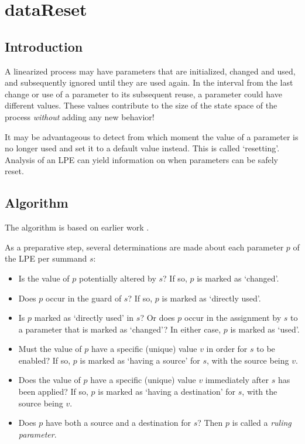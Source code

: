 \chapter{dataReset}

\section{Introduction}

A linearized process may have parameters that are initialized, changed and used, and subsequently ignored until they are used again.
In the interval from the last change or use of a parameter to its subsequent reuse, a parameter could have different values.
These values contribute to the size of the state space of the process \emph{without} adding any new behavior!

It may be advantageous to detect from which moment the value of a parameter is no longer used and set it to a default value instead.
This is called `resetting'.
Analysis of an LPE can yield information on when parameters can be safely reset.

\section{Algorithm}

The algorithm is based on earlier work \cite{van2009state}.

As a preparative step, several determinations are made about each parameter $p$ of the LPE per summand $s$:
\begin{itemize}

\item Is the value of $p$ potentially altered by $s$?
If so, $p$ is marked as `changed'.

\item Does $p$ occur in the guard of $s$?
If so, $p$ is marked as `directly used'.

\item Is $p$ marked as `directly used' in $s$?
Or does $p$ occur in the assignment by $s$ to a parameter that is marked as `changed'?
In either case, $p$ is marked as `used'.

\item Must the value of $p$ have a specific (unique) value $v$ in order for $s$ to be enabled?
If so, $p$ is marked as `having a source' for $s$, with the source being $v$.

\item Does the value of $p$ have a specific (unique) value $v$ immediately after $s$ has been applied?
If so, $p$ is marked as `having a destination' for $s$, with the source being $v$.

\item Does $p$ have both a source and a destination for $s$?
Then $p$ is called a \emph{ruling parameter}.

\end{itemize}


